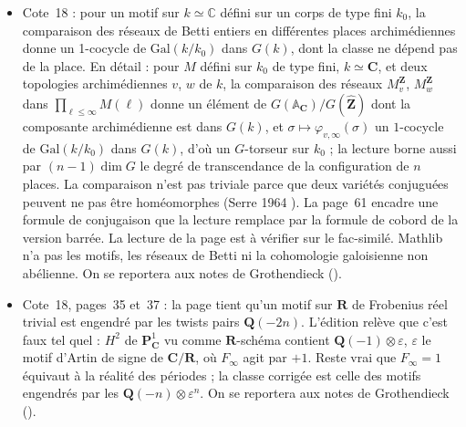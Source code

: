 \begin{itemize}\small\setlength{\itemsep}{0pt}
\item Cote~18 : pour un motif sur $k \simeq \mathbb C$ défini sur un corps de type fini $k_0$, la comparaison des réseaux de Betti entiers en différentes places archimédiennes donne un 1-cocycle de $\mathrm{Gal}(k/k_0)$ dans $G(k)$, dont la classe ne dépend pas de la place. En détail : pour $M$ défini sur $k_0$ de type fini, $k \simeq \mathbf C$, et deux topologies archimédiennes $v$, $w$ de $k$, la comparaison des réseaux $M^{\mathbf Z}_v$, $M^{\mathbf Z}_w$ dans $\prod_{\ell \leq \infty} M(\ell)$ donne un élément de $G(\mathbb A_{\mathbf C})/G(\hat{\mathbf Z})$ dont la composante archimédienne est dans $G(k)$, et $\sigma \mapsto \varphi_{v,\infty}(\sigma)$ un $1$-cocycle de $\mathrm{Gal}(k/k_0)$ dans $G(k)$, d'où un $G$-torseur sur $k_0$ ; la lecture borne aussi par $(n-1)\dim G$ le degré de transcendance de la configuration de $n$ places. La comparaison n'est pas triviale parce que deux variétés conjuguées peuvent ne pas être homéomorphes (Serre 1964 \cite{serre1964}). La page~61 encadre une formule de conjugaison que la lecture remplace par la formule de cobord de la version barrée. La lecture de la page est à vérifier sur le fac-similé. Mathlib n'a pas les motifs, les réseaux de Betti ni la cohomologie galoisienne non abélienne. On se reportera aux notes de Grothendieck ().
\item Cote~18, pages~35 et~37 : la page tient qu'un motif sur $\mathbf R$ de Frobenius réel trivial est engendré par les twists pairs $\mathbf Q(-2n)$. L'édition relève que c'est faux tel quel : $H^2$ de $\mathbf P^1_{\mathbf C}$ vu comme $\mathbf R$-schéma contient $\mathbf Q(-1) \otimes \varepsilon$, $\varepsilon$ le motif d'Artin de signe de $\mathbf C/\mathbf R$, où $F_\infty$ agit par $+1$. Reste vrai que $F_\infty = 1$ équivaut à la réalité des périodes ; la classe corrigée est celle des motifs engendrés par les $\mathbf Q(-n) \otimes \varepsilon^n$. On se reportera aux notes de Grothendieck ().
\end{itemize}

